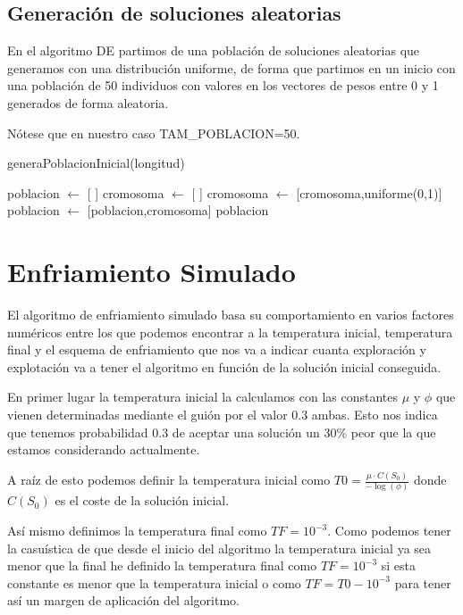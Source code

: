 \documentclass[12pt,a4paper]{article}
\begin{document}
	\subsection{Generación de soluciones aleatorias}
	
	En el algoritmo DE partimos de una población de soluciones aleatorias que generamos con una distribución uniforme, de forma que partimos en un inicio con una población de 50 individuos con valores en los vectores de pesos entre 0 y 1 generados de forma aleatoria.
	
	Nótese que en nuestro caso TAM\_POBLACION=50.
	
	\begin{algorithm}
		\caption{generaPoblacionInicial(longitud)}
		\begin{algorithmic}
			\STATE poblacion $\leftarrow$ [ ]
			\STATE cromosoma $\leftarrow$ [ ]
			\STATE cromosoma $\leftarrow$ [cromosoma,uniforme(0,1)]
			\ENDFOR
			\STATE poblacion $\leftarrow$ [poblacion,cromosoma]
			\ENDFOR
			\RETURN poblacion
		\end{algorithmic}
	\end{algorithm}

	\newpage
	
	\section{Enfriamiento Simulado}
	\label{sec:ES}
	
	El algoritmo de enfriamiento simulado basa su comportamiento en varios factores numéricos entre los que podemos encontrar a la temperatura inicial, temperatura final y el esquema de enfriamiento que nos va a indicar cuanta exploración y explotación va a tener el algoritmo en función de la solución inicial conseguida.
	
	En primer lugar la temperatura inicial la calculamos con las constantes $\mu$ y $\phi$ que vienen determinadas mediante el guión por el valor 0.3 ambas. Esto nos indica que tenemos probabilidad 0.3 de aceptar una solución un 30\% peor que la que estamos considerando actualmente.
	
	A raíz de esto podemos definir la temperatura inicial como $T0 = \frac{\mu  \cdot C(S_0)}{-\log(\phi)}$ donde $C(S_0)$ es el coste de la solución inicial.
	
	Así mismo definimos la temperatura final como $TF=10^{-3}$. Como podemos tener la casuística de que desde el inicio del algoritmo la temperatura inicial ya sea menor que la final he definido la temperatura final como $TF=10^{-3}$ si esta constante es menor que la temperatura inicial o como $TF=T0-10^{-3}$ para tener así un margen de aplicación del algoritmo.
	
\end{document}
